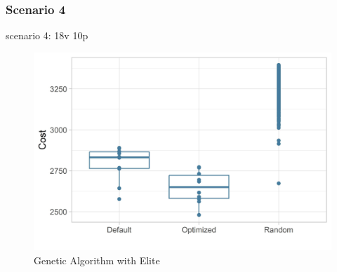 \subsubsection{Scenario 4}
scenario 4: 18v 10p
\begin{figure}[ht] 
	\label{figure:sim_4_comparison}
	\includegraphics[width=1\linewidth]{simulations/evaluation/plots/sim_1_comparison}
	\caption{Genetic Algorithm with Elite}
\end{figure}




